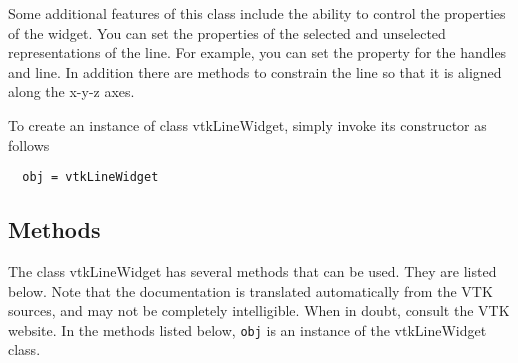  Some additional features of this class include the ability to control the
 properties of the widget. You can set the properties of the selected and
 unselected representations of the line. For example, you can set the
 property for the handles and line. In addition there are methods to
 constrain the line so that it is aligned along the x-y-z axes.

To create an instance of class vtkLineWidget, simply
invoke its constructor as follows
\begin{verbatim}
  obj = vtkLineWidget
\end{verbatim}
\subsection{Methods}

The class vtkLineWidget has several methods that can be used.
  They are listed below.
Note that the documentation is translated automatically from the VTK sources,
and may not be completely intelligible.  When in doubt, consult the VTK website.
In the methods listed below, \verb|obj| is an instance of the vtkLineWidget class.
